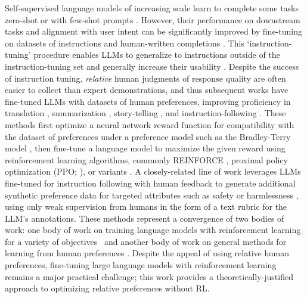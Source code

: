 Self-supervised language models of increasing scale learn to complete some tasks zero-shot \citep{radford2019language} or with few-shot prompts \citep{gpt3,megatron,chowdhery2022palm}. However, their performance on downstream tasks and alignment with user intent can be significantly improved by fine-tuning on datasets of instructions and human-written completions \citep{mishra-etal-2022-cross,sanh2022multitask,chung2022scaling,thoppilan2022lamda}. This `instruction-tuning' procedure enables LLMs to generalize to instructions outside of the instruction-tuning set and generally increase their usability \citep{chung2022scaling}. Despite the success of instruction tuning, \textit{relative} human judgments of response quality are often easier to collect than expert demonstrations, and thus subsequent works have fine-tuned LLMs with datasets of human preferences, improving proficiency in translation \citep{kreutzer-etal-2018-reliability}, summarization \citep{stiennon2022learning,ziegler2020finetuning}, story-telling \citep{ziegler2020finetuning}, and instruction-following \citep{ouyang2022training,ramamurthy2023is}. These methods first optimize a neural network reward function for compatibility with the dataset of preferences under a preference model such as the Bradley-Terry model \citep{bradley1952rankanalysis}, then fine-tune a language model to maximize the given reward using reinforcement learning algorithms, commonly REINFORCE \citep{williams1992reinforce}, proximal policy optimization (PPO; \cite{schulman2017proximal}), or variants \citep{ramamurthy2023is}. A closely-related line of work leverages LLMs fine-tuned for instruction following with human feedback to generate additional synthetic preference data for targeted attributes such as safety or harmlessness \citep{bai2022constitutional}, using only weak supervision from humans in the form of a text rubric for the LLM's annotations. These methods represent a convergence of two bodies of work: one body of work on training language models with reinforcement learning for a variety of objectives~\citep{Ranzato2015SequenceLT,paulus2018a,wu2018learning} and another body of work on general methods for learning from human preferences \citep{christiano2017deep,kupcsik2018learning}. Despite the appeal of using relative human preferences, fine-tuning large language models with reinforcement learning remains a major practical challenge; this work provides a theoretically-justified approach to optimizing relative preferences without RL.

